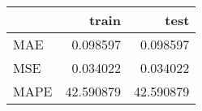 \begin{tabular}{lrr}
\toprule
{} &      train &       test \\
\midrule
MAE  &   0.098597 &   0.098597 \\
MSE  &   0.034022 &   0.034022 \\
MAPE &  42.590879 &  42.590879 \\
\bottomrule
\end{tabular}
